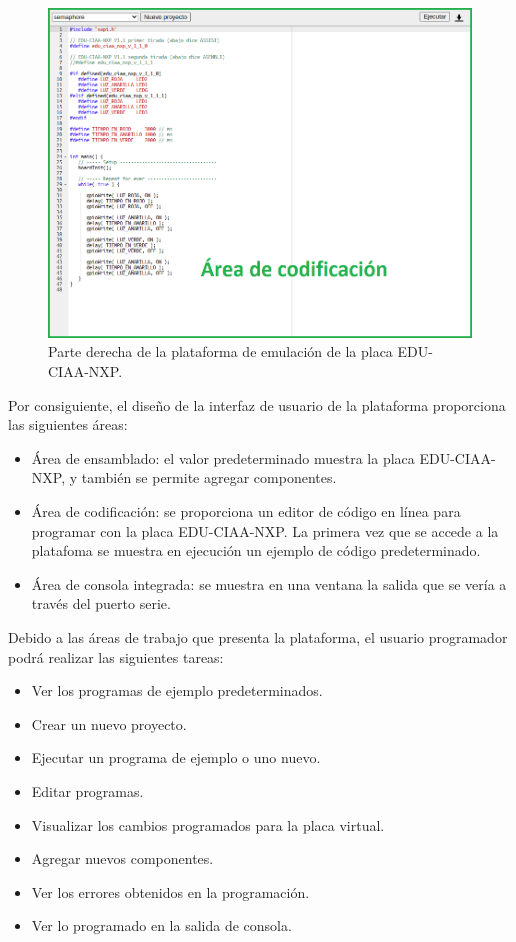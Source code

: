 \begin{figure}[ht]
	\centering
	\includegraphics[scale=.55]{./Figures/PlataformaEmulador3.png}
	\caption{Parte derecha de la plataforma de emulación de la placa EDU-CIAA-NXP.}
	\label{fig:PlataformaEmulador4}
\end{figure}

Por consiguiente, el diseño de la interfaz de usuario de la plataforma proporciona las siguientes áreas:

\begin{itemize}
	\item Área de ensamblado: el valor predeterminado muestra la placa EDU-CIAA-NXP, y también se permite agregar componentes.
	\item Área de codificación: se proporciona un editor de código en línea para programar con la placa EDU-CIAA-NXP. La primera vez que se accede a la platafoma se muestra en ejecución un ejemplo de código predeterminado.
	\item Área de consola integrada: se muestra en una ventana la salida que se vería a través del puerto serie. 
\end{itemize}


Debido a las áreas de trabajo que presenta la plataforma, el
usuario programador podrá realizar las siguientes tareas:

\begin{itemize}
	\item Ver los programas de ejemplo predeterminados.
	\item Crear un nuevo proyecto.
	\item Ejecutar un programa de ejemplo o uno nuevo.
	\item Editar programas.
	\item Visualizar los cambios programados para la placa virtual.
	\item Agregar nuevos componentes.
	\item Ver los errores obtenidos en la programación.
	\item Ver lo programado en la salida de consola.
\end{itemize}

